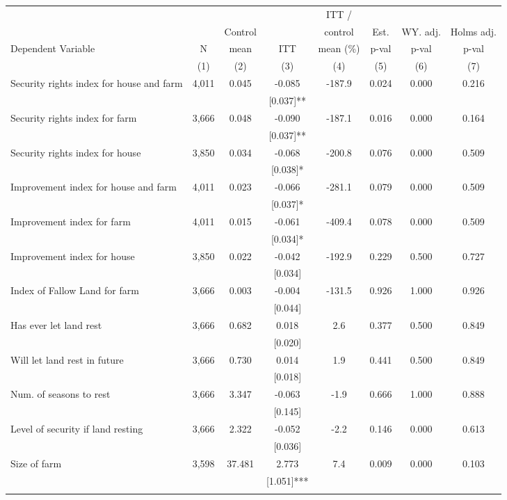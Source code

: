 \begin{tabular}{lccccccc}
\hline \noalign{\smallskip} &  &  &  & ITT / &  &  & \\
 &  & Control &  & control & Est. & WY. adj. & Holms adj.\\
Dependent Variable & N & mean & ITT & mean (\%) & p-val & p-val & p-val\\
 & (1) & (2) & (3) & (4) & (5) & (6) & (7)\\
\noalign{\smallskip}\hline \noalign{\smallskip}Security rights index for house and farm & 4,011 & 0.045 & -0.085 & -187.9 & 0.024 & 0.000 & 0.216\\
 &  &  & [0.037]** &  &  &  & \\
\quad Security rights index for farm & 3,666 & 0.048 & -0.090 & -187.1 & 0.016 & 0.000 & 0.164\\
 &  &  & [0.037]** &  &  &  & \\
\quad Security rights index for house & 3,850 & 0.034 & -0.068 & -200.8 & 0.076 & 0.000 & 0.509\\
 &  &  & [0.038]* &  &  &  & \\
Improvement index for house and farm & 4,011 & 0.023 & -0.066 & -281.1 & 0.079 & 0.000 & 0.509\\
 &  &  & [0.037]* &  &  &  & \\
\quad Improvement index for farm & 4,011 & 0.015 & -0.061 & -409.4 & 0.078 & 0.000 & 0.509\\
 &  &  & [0.034]* &  &  &  & \\
\quad Improvement index for house & 3,850 & 0.022 & -0.042 & -192.9 & 0.229 & 0.500 & 0.727\\
 &  &  & [0.034] &  &  &  & \\
Index of Fallow Land for farm & 3,666 & 0.003 & -0.004 & -131.5 & 0.926 & 1.000 & 0.926\\
 &  &  & [0.044] &  &  &  & \\
\quad Has ever let land rest & 3,666 & 0.682 & 0.018 & 2.6 & 0.377 & 0.500 & 0.849\\
 &  &  & [0.020] &  &  &  & \\
\quad Will let land rest in future & 3,666 & 0.730 & 0.014 & 1.9 & 0.441 & 0.500 & 0.849\\
 &  &  & [0.018] &  &  &  & \\
\quad Num. of seasons to rest & 3,666 & 3.347 & -0.063 & -1.9 & 0.666 & 1.000 & 0.888\\
 &  &  & [0.145] &  &  &  & \\
\quad Level of security if land resting & 3,666 & 2.322 & -0.052 & -2.2 & 0.146 & 0.000 & 0.613\\
 &  &  & [0.036] &  &  &  & \\
Size of farm & 3,598 & 37.481 & 2.773 & 7.4 & 0.009 & 0.000 & 0.103\\
 &  &  & [1.051]*** &  &  &  & \\
\noalign{\smallskip}\hline\end{tabular}
